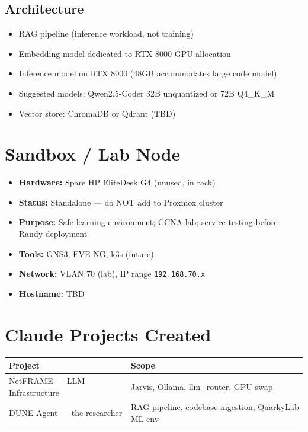 \documentclass[11pt, letterpaper]{article}
\begin{document}
\subsection{Architecture}
\begin{itemize}[leftmargin=*, nosep]
    \item RAG pipeline (inference workload, not training)
    \item Embedding model dedicated to RTX 8000 GPU allocation
    \item Inference model on RTX 8000 (48GB accommodates large code model)
    \item Suggested models: Qwen2.5-Coder 32B unquantized or 72B Q4\_K\_M
    \item Vector store: ChromaDB or Qdrant (TBD)
\end{itemize}

\section{Sandbox / Lab Node}

\begin{itemize}[leftmargin=*, nosep]
    \item \textbf{Hardware:} Spare HP EliteDesk G4 (unused, in rack)
    \item \textbf{Status:} Standalone — do NOT add to Proxmox cluster
    \item \textbf{Purpose:} Safe learning environment; CCNA lab; service testing before Randy deployment
    \item \textbf{Tools:} GNS3, EVE-NG, k3s (future)
    \item \textbf{Network:} VLAN 70 (lab), IP range \texttt{192.168.70.x}
    \item \textbf{Hostname:} TBD
\end{itemize}

\section{Claude Projects Created}

\begin{tabularx}{\textwidth}{lX}
\toprule
\textbf{Project} & \textbf{Scope} \\
\midrule
NetFRAME --- LLM Infrastructure & Jarvis, Ollama, llm\_router, GPU swap \\
DUNE Agent --- the researcher          & RAG pipeline, codebase ingestion, QuarkyLab ML env \\
\bottomrule
\end{tabularx}
\end{document}
